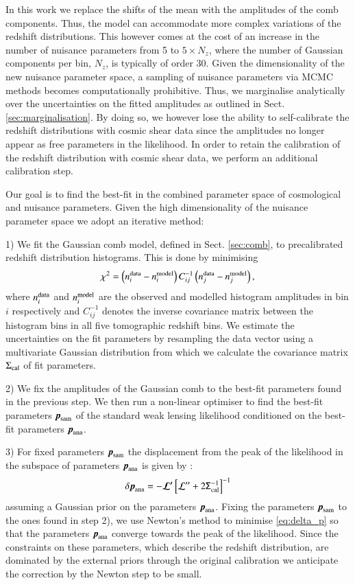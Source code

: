 \documentclass{aa}
\newcommand{\eq}[1]{\begin{equation}  #1 \end{equation}}
\begin{document}
In this work we replace the shifts of the mean with the amplitudes of the comb components. Thus, the model can accommodate more complex variations of the redshift distributions. This however comes at the cost of an increase in the number of nuisance parameters from 5 to $5 \times N_z$, where the number of Gaussian components per bin, $N_z$, is typically of order 30.  Given the dimensionality of the new nuisance parameter space, a sampling of nuisance parameters via MCMC methods becomes computationally prohibitive. Thus, we marginalise analytically over the uncertainties on the fitted amplitudes as outlined in Sect. \ref{sec:marginalisation}. By doing so, we however lose the ability to self-calibrate the redshift distributions with cosmic shear data since the amplitudes no longer appear as free parameters in the likelihood. In order to retain the calibration of the redshift distribution with cosmic shear data, we perform an additional calibration step.

Our goal is to find the best-fit in the combined parameter space of cosmological and nuisance parameters. Given the high dimensionality of the nuisance parameter space we adopt an iterative method:

1) We fit the Gaussian comb model, defined in Sect. \ref{sec:comb}, to precalibrated redshift distribution histograms. This is done by minimising 
\eq{
\chi^2 = \left(n^{\rm data}_i - n^{\rm model}_i\right) C^{-1}_{ij} \left(n^{\rm data}_j - n^{\rm model}_j\right),
} 
where $n^{\rm data}_i$ and $n^{\rm model}_i$ are the observed and modelled histogram amplitudes in bin $i$ respectively and $C^{-1}_{ij}$ denotes the inverse covariance matrix between the histogram bins in all five tomographic redshift bins. We estimate the uncertainties on the fit parameters by resampling the data vector using a multivariate Gaussian distribution from which we calculate the covariance matrix $\Sigma_{\rm cal}$ of fit parameters.

2) We fix the amplitudes of the Gaussian comb to the best-fit parameters found in the previous step. We then run a non-linear optimiser to find the best-fit parameters $\boldsymbol{p}_{\rm sam}$ of the standard weak lensing likelihood conditioned on the best-fit parameters $\boldsymbol{p}_{\rm ana}$.

3) For fixed parameters $\boldsymbol{p}_{\rm sam}$ the displacement from the peak of the likelihood in the subspace of parameters $\boldsymbol{p}_{\rm ana}$ is given by \citep{taylor10}:
\eq{
\label{eq:delta_p}
\delta\boldsymbol{p}_{\rm ana} = -\boldsymbol{\cal L^\prime}\left[{\cal L^{\prime\prime}}+2\tens{\Sigma}_{\rm cal}^{-1}\right]^{-1}
}
assuming a Gaussian prior on the parameters $\boldsymbol{p}_{\rm ana}$. Fixing the parameters $\boldsymbol{p}_{\rm sam}$ to the ones found in step 2), we use Newton's method to minimise \eqref{eq:delta_p} so that the parameters $\boldsymbol{p}_{\rm ana}$ converge towards the peak of the likelihood. Since the constraints on these parameters, which describe the redshift distribution, are dominated by the external priors through the original calibration we anticipate the correction by the Newton step to be small.  
\end{document}
